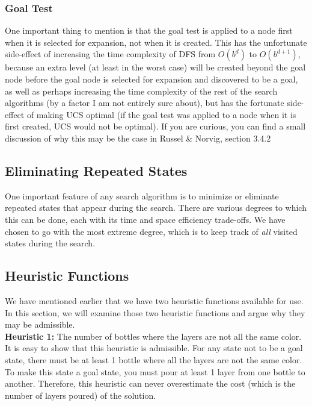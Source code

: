 \documentclass{article}
\begin{document}
\subsubsection{Goal Test}
One important thing to mention is that the goal test is applied to a node first when it is selected for expansion, not when it is created. This has the unfortunate side-effect of increasing the time complexity of DFS from $O(b^{d})$ to $O(b^{d+1})$, because an extra level (at least in the worst case) will be created beyond the goal node before the goal node is selected for expansion and discovered to be a goal, as well as perhaps increasing the time complexity of the rest of the search algorithms (by a factor I am not entirely sure about), but has the fortunate side-effect of making UCS optimal (if the goal test was applied to a node when it is first created, UCS would not be optimal). If you are curious, you can find a small discussion of why this may be the case in Russel \& Norvig, section 3.4.2

\subsection{Eliminating Repeated States}

One important feature of any search algorithm is to minimize or eliminate repeated states that appear during the search. There are various degrees to which this can be done, each with its time and space efficiency trade-offs. We have chosen to go with the most extreme degree, which is to keep track of \textit{all} visited states during the search.
\subsection{Heuristic Functions}

We have mentioned earlier that we have two heuristic functions available for use. In this section, we will examine those two heuristic functions and argue why they may be admissible. \\

\textbf{Heuristic 1:} The number of bottles where the layers are not all the same color. \\

It is easy to show that this heuristic is admissible. For any state not to be a goal state, there must be at least 1 bottle where all the layers are not the same color. To make this state a goal state, you must pour at least 1 layer from one bottle to another. Therefore, this heuristic can never overestimate the cost (which is the number of layers poured) of the solution. \\
\end{document}
